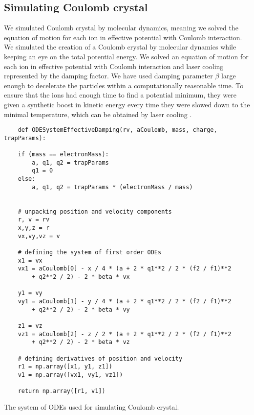 \subsection{Simulating Coulomb crystal}
We simulated Coulomb crystal by molecular dynamics, meaning we solved the equation of motion for each ion in effective potential with Coulomb interaction. 
We simulated the creation of a Coulomb crystal by molecular dynamics while keeping an eye on the total potential energy. We solved an equation of motion for each ion in effective potential with Coulomb interaction and laser cooling represented by the damping factor. We have used damping parameter $\beta$ large enough to decelerate the particles within a computationally reasonable time. To ensure that the ions had enough time to find a potential minimum, they were given a synthetic boost in kinetic energy every time they were slowed down to the minimal temperature, which can be obtained by laser cooling . 

\begin{listing}[H]
\begin{lstlisting}
	def ODESystemEffectiveDamping(rv, aCoulomb, mass, charge, trapParams):

    if (mass == electronMass):        
        a, q1, q2 = trapParams
        q1 = 0
    else:
        a, q1, q2 = trapParams * (electronMass / mass)
    
	    
    # unpacking position and velocity components
    r, v = rv
    x,y,z = r
    vx,vy,vz = v
    
    # defining the system of first order ODEs
    x1 = vx
    vx1 = aCoulomb[0] - x / 4 * (a + 2 * q1**2 / 2 * (f2 / f1)**2 
    	+ q2**2 / 2) - 2 * beta * vx
    
    y1 = vy
    vy1 = aCoulomb[1] - y / 4 * (a + 2 * q1**2 / 2 * (f2 / f1)**2 
    	+ q2**2 / 2) - 2 * beta * vy
    
    z1 = vz
    vz1 = aCoulomb[2] - z / 2 * (a + 2 * q1**2 / 2 * (f2 / f1)**2 
    	+ q2**2 / 2) - 2 * beta * vz
    
	# defining derivatives of position and velocity 
    r1 = np.array([x1, y1, z1])
    v1 = np.array([vx1, vy1, vz1])

    return np.array([r1, v1])	    
\end{lstlisting}
\caption{The system of ODEs used for simulating Coulomb crystal.}
\label{lst:crystal}
\end{listing} 